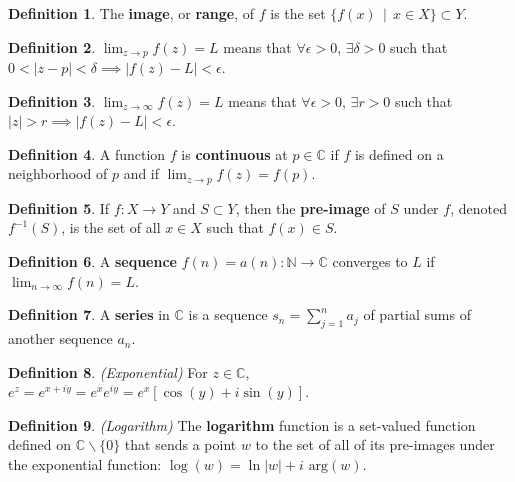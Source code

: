 \documentclass[a4paper]{article}
\theoremstyle{definition}
\newtheorem{definition}{Definition}
\begin{document}
	\begin{definition}
		The \textbf{image}, or \textbf{range}, of $f$ is the set $\{ f(x) \; \, | \; \, x \in X\} \subset Y$.
	\end{definition}
	
	\begin{definition}
		$\lim_{z \to p} f(z) = L$ means that $\forall \epsilon > 0$, $\exists \delta > 0$ such that $0 < |z - p| < \delta \implies |f(z) - L| < \epsilon$.
	\end{definition}
	
	\begin{definition}
		$\lim_{z \to \infty} f(z) = L$ means that $\forall \epsilon > 0$, $\exists r > 0$ such that $|z| > r \implies |f(z) - L| < \epsilon$.
	\end{definition}
	
	\begin{definition}
		A function $f$ is \textbf{continuous} at $p \in \mathbb{C}$ if $f$ is defined on a neighborhood of $p$ and if $\lim_{z \to p} f(z) = f(p)$.
	\end{definition}
	
	\begin{definition}
		If $f: X \rightarrow Y$ and $S \subset Y$, then the \textbf{pre-image} of $S$ under $f$, denoted $f^{-1}(S)$, is the set of all $x \in X$ such that $f(x) \in S$.
	\end{definition}
	
	\begin{definition}
		A \textbf{sequence} $f(n) = a(n) : \mathbb{N} \rightarrow \mathbb{C}$ converges to $L$ if $\lim_{n \to \infty} f(n) = L$.
	\end{definition}
	
	\begin{definition}
		A \textbf{series} in $\mathbb{C}$ is a sequence $s_{n} = \sum_{j=1}^{n} a_{j}$ of partial sums of another sequence $a_{n}$.
	\end{definition}
	
	\begin{definition}
		\emph{(Exponential)}
		For $z \in \mathbb{C}$, $e^{z} = e^{x + iy} = e^{x}e^{iy} = e^{x}[\cos{(y)} + i \sin{(y)}]$.
	\end{definition}
	
	\begin{definition}
		\emph{(Logarithm)}
		The \textbf{logarithm} function is a set-valued function defined on $\mathbb{C} \backslash \{0\}$ that sends a point $w$ to the set of all of its pre-images under the exponential function: $\log(w) = \ln|w| + i$ $\text{arg}(w)$.
	\end{definition}
	
\end{document}
